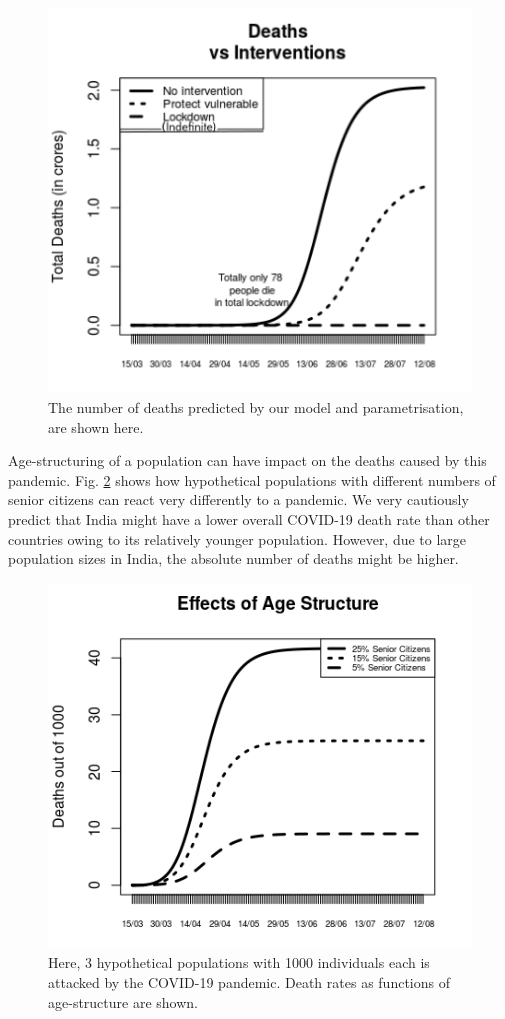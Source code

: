 \documentclass{article}
\begin{document}
\begin{figure}[htp]
\centering
\includegraphics[width=.8\linewidth]{deathsvsints.png}
\caption{The number of deaths predicted by our model and parametrisation, are shown here.}
\label{fig:deaths}
\end{figure}

Age-structuring of a population can have impact on the deaths caused by this pandemic.
Fig. \ref{fig:age} shows how hypothetical populations with different numbers of senior citizens 
can react very differently to a pandemic. We very cautiously predict that India might have a lower
overall COVID-19 death rate than other countries owing to its relatively younger population.
However, due to large population sizes in India, the absolute number of deaths might be higher.

\begin{figure}
\centering
\includegraphics[width=.8\linewidth]{effectsofage.png}
\caption{Here, 3 hypothetical populations with 1000 individuals each is attacked by the COVID-19 pandemic.
	Death rates as functions of age-structure are shown.}
\label{fig:age}
\end{figure}
\end{document}
